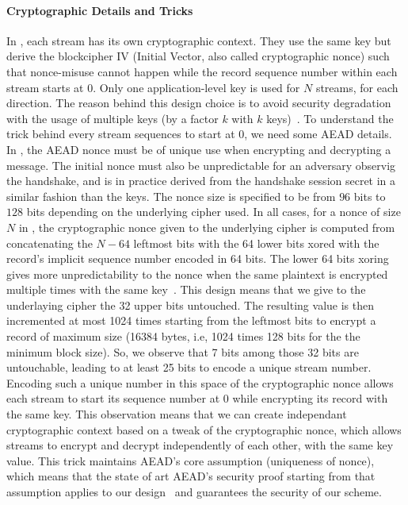 \paragraph*{Cryptographic Details and Tricks}
In \tcpls, each stream has its own cryptographic context. They use the same key
but derive the blockcipher IV (Initial Vector, also called cryptographic nonce)
such that nonce-misuse cannot happen while the record sequence number within
each stream starts at 0. Only one application-level key is used for $N$ streams,
for each direction.  The reason behind this design choice is to avoid security
degradation with the usage of multiple keys (by a factor $k$ with $k$
keys)~\cite{chatterjee2011another}. To understand the trick behind every
stream sequences to start at 0, we need some AEAD details. In \tcpls, the AEAD
nonce must be of unique use when encrypting and decrypting a message. The
initial nonce must also be unpredictable for an adversary observig the
handshake, and is in practice derived from the \tls handshake session secret in
a similar fashion than the \tls keys. The nonce size is specified to be from
$96$ bits to $128$ bits depending on the underlying cipher used. In all cases,
for a nonce of size $N$ in \tls, the cryptographic nonce given to the underlying
cipher is computed from concatenating the $N-64$ leftmost bits with the 64 lower
bits xored with the record's implicit sequence number encoded in 64 bits. The
lower 64 bits xoring gives more unpredictability to the nonce when the same
plaintext is encrypted multiple times with the same
key~\cite{bellare2016multi,hoang2018multi}. This design means that we give to
the underlaying cipher the 32 upper bits untouched. The resulting value is then
incremented at most 1024 times starting from the leftmost bits to encrypt a \tls
record of maximum size (16384 bytes, i.e, 1024 times 128 bits for the the
minimum block size). So, we observe that 7 bits among those 32 bits are
untouchable, leading to at least 25 bits to encode a unique stream number.
Encoding such a unique number in this space of the cryptographic nonce allows
each stream to start its sequence number at 0 while encrypting its record with
the same key. This observation means that we can create independant
cryptographic context based on a tweak of the cryptographic nonce, which allows
streams to encrypt and decrypt independently of each other, with the same key
value. This trick maintains AEAD's core assumption (uniqueness of nonce), which
means that the state of art AEAD's security proof starting from that assumption
applies to our design~\cite{chatterjee2011another} and guarantees the security
of our scheme.

